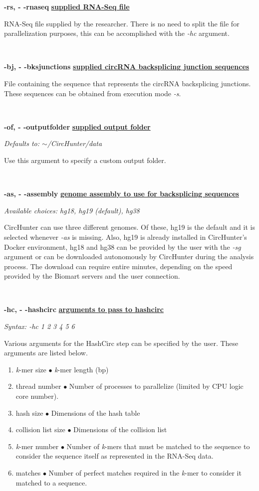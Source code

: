 \documentclass[letterpaper,12pt]{article}
\newcommand{\entry}[4]{
  \begin{minipage}[t]{.05\textwidth}
  \end{minipage}
  \hfill\vline\hfill
  \begin{minipage}[t]{.90\textwidth}
    {\bfseries#1} {\hfill\underline{\bfseries#2}}
    
    \textit{#3}
    
    {#4}
  \end{minipage}\\\vspace{.25cm}}
\begin{document}
\entry
{-rs, - -rnaseq}
{supplied RNA-Seq file}
{}
{RNA-Seq file supplied by the researcher. There is no need to split the file for parallelization purposes, this can be accomplished with the \textit{-hc} argument.}

\entry
{-bj, - -bksjunctions}
{supplied circRNA backsplicing junction sequences}
{}
{File containing the sequence that represents the circRNA backsplicing junctions. These sequences can be obtained from execution mode \textit{-s}.}

\entry
{-of, - -outputfolder}
{supplied output folder}
{Defaults to: $\sim$/CircHunter/data}
{Use this argument to specify a custom output folder.}

\entry
{-as, - -assembly}
{genome assembly to use for backsplicing sequences}
{Available choices: hg18, hg19 (default), hg38}
{CircHunter can use three different genomes. Of these, hg19 is the default and it is selected whenever \textit{-as} is missing. Also, hg19 is already installed in CircHunter's Docker environment, hg18 and hg38 can be provided by the user with the \textit{-sg} argument or can be downloaded autonomously by CircHunter during the analysis process. The download can require entire minutes, depending on the speed provided by the Biomart servers and the user connection.}

\entry
{-hc, - -hashcirc}
{arguments to pass to hashcirc}
{Syntax: -hc 1 2 3 4 5 6}
{Various arguments for the HashCirc step can be specified by the user. These arguments are listed below.
  \begin{enumerate}
    \item\textit{k}-mer size \quad $\bullet$ \quad \textit{k}-mer length (bp)
    \item thread number \quad $\bullet$ \quad Number of processes to parallelize (limited by CPU logic core number). 
    \item hash size \quad $\bullet$ \quad Dimensions of the hash table
    \item collision list size \quad $\bullet$ \quad Dimensions of the collision list
    \item\textit{k}-mer number \quad $\bullet$ \quad Number of \textit{k}-mers that must be matched to the sequence to consider the sequence itself as represented in the RNA-Seq data.
    \item matches \quad $\bullet$ \quad Number of perfect matches required in the \textit{k}-mer to consider it matched to a sequence.
  \end{enumerate}

}
\end{document}
